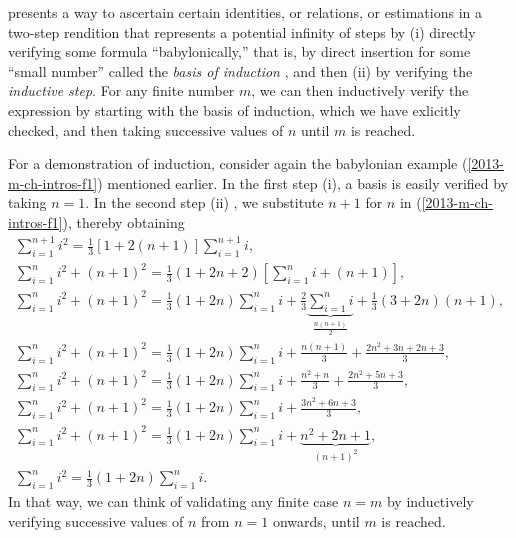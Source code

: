  presents a way to ascertain certain identities, or relations, or estimations
in a two-step rendition that represents a potential infinity of
steps by (i)  directly verifying some formula ``babylonically,''
that is,  by direct insertion for some ``small number'' called the {\em basis of induction}
, and then (ii) by verifying the {\em inductive step}.
For any finite number $m$, we can then inductively verify the expression by starting with the basis of induction, which we have exlicitly checked,
and then taking successive values of $n$ until $m$ is reached.

{\color{OliveGreen}
\bproof
For a demonstration of induction, consider again the babylonian example (\ref{2013-m-ch-intros-f1}) mentioned earlier.
In the first step (i), a basis is easily verified by taking $n=1$.
In the second step (ii) , we substitute $n+1$ for $n$ in (\ref{2013-m-ch-intros-f1}),
thereby obtaining
\begin{equation}
\begin{split}
\sum_{i=1}^{n+1} i^2 = \frac{1}{3}\left[1+2(n+1)\right]\sum_{i=1}^{n+1} i              ,
\\
\sum_{i=1}^{n} i^2 + (n+1)^2 = \frac{1}{3}\left(1+2 n+2\right)\left[\sum_{i=1}^{n} i   +(n+1) \right],
\\
\sum_{i=1}^{n} i^2 + (n+1)^2 = \frac{1}{3}\left(1+2 n\right)\sum_{i=1}^{n} i  + \frac{2}{3}\underbrace{\sum_{i=1}^{n} i}_{\frac{n(n+1)}{2}} + \frac{1}{3}\left(3+2 n\right)(n+1) ,
\\
\sum_{i=1}^{n} i^2 + (n+1)^2 = \frac{1}{3}\left(1+2 n\right)\sum_{i=1}^{n} i  + \frac{n(n+1)}{3}+ \frac{2n^2 +3n + 2n +3}{3} ,
\\
\sum_{i=1}^{n} i^2 + (n+1)^2 = \frac{1}{3}\left(1+2 n\right)\sum_{i=1}^{n} i  + \frac{n^2+n}{3}+ \frac{2n^2 +5n +3}{3} ,
\\
\sum_{i=1}^{n} i^2 + (n+1)^2 = \frac{1}{3}\left(1+2 n\right)\sum_{i=1}^{n} i  +  \frac{3n^2 +6n +3}{3} ,
\\
\sum_{i=1}^{n} i^2 + (n+1)^2 = \frac{1}{3}\left(1+2 n\right)\sum_{i=1}^{n} i  +   \underbrace{n^2 +2n +1}_{(n+1)^2} ,
\\
\sum_{i=1}^{n} i^2  = \frac{1}{3}\left(1+2 n\right)\sum_{i=1}^{n} i
.
\end{split}
\label{2013-m-ch-intros-f2}
\end{equation}
In that way, we can think of validating any finite case $n=m$ by inductively verifying successive values of $n$ from $n=1$ onwards,  until $m$ is reached.

\eproof
}






